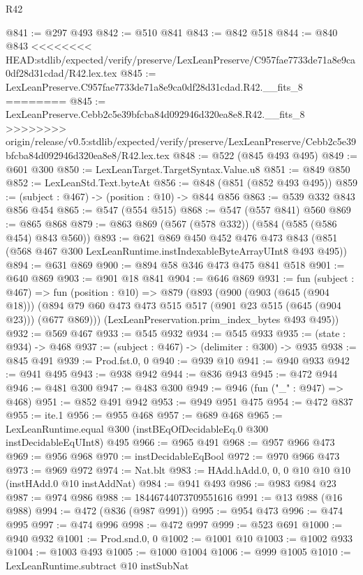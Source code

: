 \begin{lexlean}{R42}
\begin{coremodule}
{{{{{{{{{{{{{{{{{@841 := @297 @493
@842 := @510 @841
@843 := @842 @518
@844 := @840 @843
<<<<<<<< HEAD:stdlib/expected/verify/preserve/LexLeanPreserve/C957fae7733de71a8e9ca0df28d31cdad/R42.lex.tex
@845 := LexLeanPreserve.C957fae7733de71a8e9ca0df28d31cdad.R42.__fits_8
========
@845 := LexLeanPreserve.Cebb2c5e39bfcba84d092946d320ea8e8.R42.__fits_8
>>>>>>>> origin/release/v0.5:stdlib/expected/verify/preserve/LexLeanPreserve/Cebb2c5e39bfcba84d092946d320ea8e8/R42.lex.tex
@848 := @522 (@845 @493 @495)
@849 := @601 @300
@850 := LexLeanTarget.TargetSyntax.Value.u8
@851 := @849 @850
@852 := LexLeanStd.Text.byteAt
@856 := @848 (@851 (@852 @493 @495))
@859 := (subject : @467) -> (position : @10) -> @844 @856
@863 := @539 @332 @843 @856 @454
@865 := @547 (@554 @515)
@868 := @547 (@557 @841) @560
@869 := @865 @868
@879 := @863 @869 (@567 (@578 @332)) (@584 (@585 (@586 @454) @843 @560))
@893 := @621
    @869
    @450
    @452
    @476
    @473
    @843
    (@851 (@568 @467 @300 LexLeanRuntime.instIndexableByteArrayUInt8 @493 @495))
@894 := @631 @869
@900 := @894 @58 @346 @473 @475 @841 @518
@901 := @640 @869
@903 := @901 @18 @841
@904 := @646 @869
@931 := fun (subject : @467) =>
  fun (position : @10) =>
  @879
    (@893
      (@900
        (@903 (@645 (@904 @18)))
        (@894 @79 @60 @473 @473 @515 @517 (@901 @23 @515 (@645 (@904 @23))) (@677 @869)))
      (LexLeanPreservation.prim_index_bytes @493 @495))
@932 := @569 @467
@933 := @545 @932
@934 := @545 @933
@935 := (state : @934) -> @468
@937 := (subject : @467) -> (delimiter : @300) -> @935
@938 := @845 @491
@939 := Prod.fst.{0, 0}
@940 := @939 @10
@941 := @940 @933
@942 := @941 @495
@943 := @938 @942
@944 := @836 @943
@945 := @472 @944
@946 := @481 @300
@947 := @483 @300
@949 := @946 (fun ("_" : @947) => @468)
@951 := @852 @491 @942
@953 := @949 @951 @475
@954 := @472 @837
@955 := ite.{1}
@956 := @955 @468
@957 := @689 @468
@965 := LexLeanRuntime.equal @300 (instBEqOfDecidableEq.{0} @300 instDecidableEqUInt8) @495
@966 := @965 @491
@968 := @957 @966 @473
@969 := @956 @968
@970 := instDecidableEqBool
@972 := @970 @966 @473
@973 := @969 @972
@974 := Nat.blt
@983 := HAdd.hAdd.{0, 0, 0} @10 @10 @10 (instHAdd.{0} @10 instAddNat)
@984 := @941 @493
@986 := @983 @984 @23
@987 := @974 @986
@988 := 18446744073709551616
@991 := @13 @988 (@16 @988)
@994 := @472 (@836 (@987 @991))
@995 := @954 @473
@996 := @474 @995
@997 := @474 @996
@998 := @472 @997
@999 := @523 @691
@1000 := @940 @932
@1001 := Prod.snd.{0, 0}
@1002 := @1001 @10
@1003 := @1002 @933
@1004 := @1003 @493
@1005 := @1000 @1004
@1006 := @999 @1005
@1010 := LexLeanRuntime.subtract @10 instSubNat
}}}}}}}}}}}}}}}}}
\end{coremodule}
\end{lexlean}
